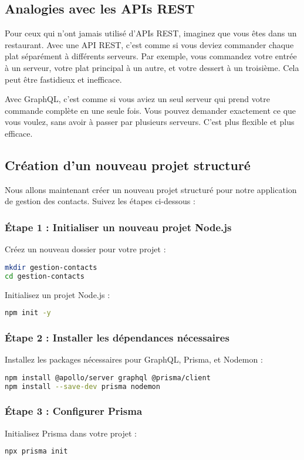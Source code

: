 \documentclass{article}
\begin{document}
\subsection{Analogies avec les APIs REST}
Pour ceux qui n'ont jamais utilisé d'APIs REST, imaginez que vous êtes dans un restaurant. Avec une API REST, c'est comme si vous deviez commander chaque plat séparément à différents serveurs. Par exemple, vous commandez votre entrée à un serveur, votre plat principal à un autre, et votre dessert à un troisième. Cela peut être fastidieux et inefficace.

Avec GraphQL, c'est comme si vous aviez un seul serveur qui prend votre commande complète en une seule fois. Vous pouvez demander exactement ce que vous voulez, sans avoir à passer par plusieurs serveurs. C'est plus flexible et plus efficace.

\subsection{Création d'un nouveau projet structuré}
Nous allons maintenant créer un nouveau projet structuré pour notre application de gestion des contacts. Suivez les étapes ci-dessous :

\subsubsection{Étape 1 : Initialiser un nouveau projet Node.js}
Créez un nouveau dossier pour votre projet :
\begin{lstlisting}[language=bash]
mkdir gestion-contacts
cd gestion-contacts
\end{lstlisting}

Initialisez un projet Node.js :
\begin{lstlisting}[language=bash]
npm init -y
\end{lstlisting}

\subsubsection{Étape 2 : Installer les dépendances nécessaires}
Installez les packages nécessaires pour GraphQL, Prisma, et Nodemon :
\begin{lstlisting}[language=bash]
npm install @apollo/server graphql @prisma/client
npm install --save-dev prisma nodemon
\end{lstlisting}

\subsubsection{Étape 3 : Configurer Prisma}
Initialisez Prisma dans votre projet :
\begin{lstlisting}[language=bash]
npx prisma init
\end{lstlisting}
\end{document}

